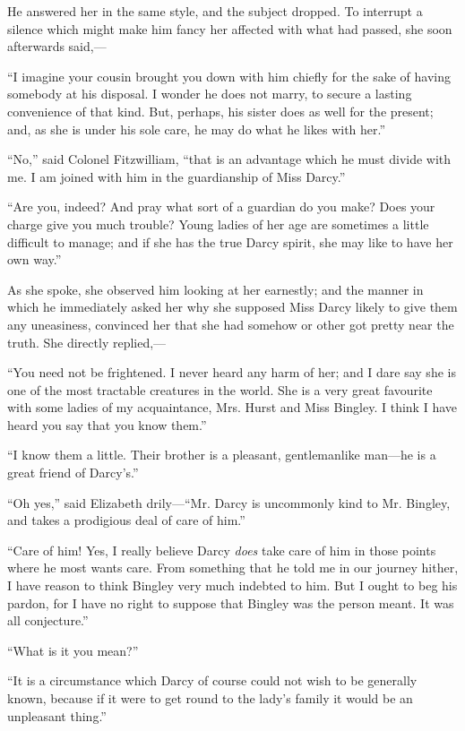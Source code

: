 \documentclass[12pt,openright]{book}
\begin{document}
He answered her in the same style, and the subject dropped. To interrupt a silence which might make him fancy her affected with what had passed, she soon afterwards said,—

“I imagine your cousin brought you down with him chiefly for the sake of having somebody at his disposal. I wonder he does not marry, to secure a lasting convenience of that kind. But, perhaps, his sister does as well for the present; and, as she is under his sole care, he may do what he likes with her.”

“No,” said Colonel Fitzwilliam, “that is an advantage which he must divide with me. I am joined with him in the guardianship of Miss Darcy.”

“Are you, indeed? And pray what sort of a guardian do you make? Does your charge give you much trouble? Young ladies of her age are sometimes a little difficult to manage; and if she has the true Darcy spirit, she may like to have her own way.”

As she spoke, she observed him looking at her earnestly; and the manner in which he immediately asked her why she supposed Miss Darcy likely to give them any uneasiness, convinced her that she had somehow or other got pretty near the truth. She directly replied,—

“You need not be frightened. I never heard any harm of her; and I dare say she is one of the most tractable creatures in the world. She is a very great favourite with some ladies of my acquaintance, Mrs. Hurst and Miss Bingley. I think I have heard you say that you know them.”

“I know them a little. Their brother is a pleasant, gentlemanlike man—he is a great friend of Darcy’s.”

“Oh yes,” said Elizabeth drily—“Mr. Darcy is uncommonly kind to Mr. Bingley, and takes a prodigious deal of care of him.”

“Care of him! Yes, I really believe Darcy \textit{does} take care of him in those points where he most wants care. From something that he told me in our journey hither, I have reason to think Bingley very much indebted to him. But I ought to beg his pardon, for I have no right to suppose that Bingley was the person meant. It was all conjecture.”

“What is it you mean?”

“It is a circumstance which Darcy of course could not wish to be generally known, because if it were to get round to the lady’s family it would be an unpleasant thing.”
\end{document}
